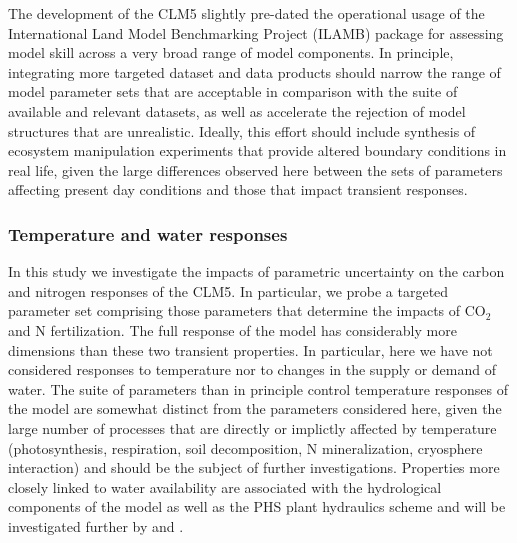 \documentclass[draft,linenumbers]{agujournal}
\begin{document}
The development of the CLM5 slightly pre-dated the operational usage of the International Land Model Benchmarking Project (ILAMB) package \cite{collier2016} for assessing model skill across a very broad range of model components.  In principle, integrating more targeted dataset and data products should narrow the range of model parameter sets that are acceptable in comparison with the suite of available and relevant datasets, as well as accelerate the rejection of model structures that are unrealistic. Ideally, this effort should include synthesis of ecosystem manipulation experiments that provide altered boundary conditions in real life, given the large differences observed here between the sets of parameters affecting present day conditions and those that impact transient responses.

\subsubsection{Temperature and water responses}
In this study we investigate the impacts of parametric uncertainty on the carbon and nitrogen responses of the CLM5. In particular, we probe a targeted parameter set comprising those parameters that determine the impacts of CO$_{2}$ and N fertilization. The full response of the model has considerably more dimensions than these two transient properties. In particular, here we have not considered responses to temperature nor to changes in the supply or demand of water. The suite of parameters than in principle control temperature responses of the model are somewhat distinct from the parameters considered here, given the large number of processes that are directly or implictly affected by temperature (photosynthesis, respiration, soil decomposition, N mineralization, cryosphere interaction) and should be the subject of further investigations. Properties more closely linked to water availability are associated with the hydrological components of the model as well as the PHS plant hydraulics scheme and will be investigated further by \cite{dagon} and \cite{kennedy}. 
 
\end{document}
